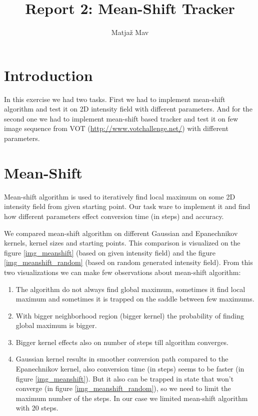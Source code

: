 \documentclass[runningheads]{llncs}
\begin{document}
% 
\title{Report 2: Mean-Shift Tracker}
\author{Matjaž Mav}
%
\maketitle              %
%
 
\section{Introduction}
In this exercise we had two tasks. First we had to implement mean-shift algorithm and test it on 2D intensity field with different parameters. And for the second one we had to implement mean-shift based tracker and test it on few image sequence from VOT (\url{http://www.votchallenge.net/}) with different parameters.

\section{Mean-Shift}
Mean-shift algorithm is used to iteratively find local maximum on some 2D intensity field from given starting point. Our task ware to implement it and find how different parameters effect conversion time (in steps) and accuracy.

We compared mean-shift algorithm on different Gaussian and Epanechnikov kernels, kernel sizes and starting points. This comparison is visualized on the figure \ref{img_meanshift} (based on given intensity field) and the figure \ref{img_meanshift_random} (based on random generated intensity field). From this two visualizations we can make few observations about mean-shift algorithm:
\begin{enumerate}
    \item The algorithm do not always find global maximum, sometimes it find local maximum and sometimes it is trapped on the saddle between few maximums.
    \item With bigger neighborhood region (bigger kernel) the probability of finding global maximum is bigger.
    \item Bigger kernel effects also on number of steps till algorithm converges.
    \item Gaussian kernel results in smoother conversion path compared to the Epanechnikov kernel, also conversion time (in steps) seems to be faster (in figure \ref{img_meanshift}). But it also can be trapped in state  that won't  converge (in figure \ref{img_meanshift_random}), so we need to limit the maximum number of the steps. In our case we limited mean-shift algorithm with 20 steps.
\end{enumerate}
\end{document}
